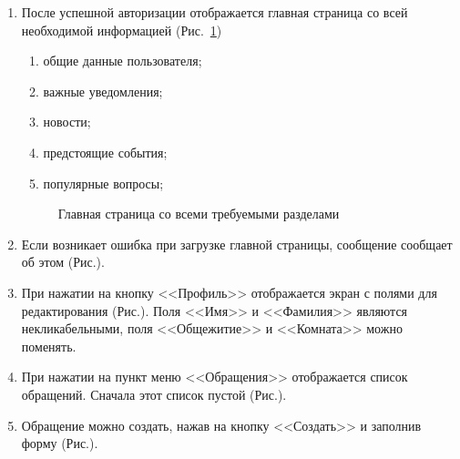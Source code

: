 \documentclass{../includes/TechDoc}
\begin{document}
\begin{enumerate}
        \item После успешной авторизации отображается главная страница со всей необходимой информацией (Рис.~\ref{fig:main_page})
        \begin{enumerate}
            \item общие данные пользователя;
            \item важные уведомления;
            \item новости;
            \item предстоящие события;
            \item популярные вопросы;
        \end{enumerate}
        \begin{figure}[ht]
            \centering
            \caption{Главная страница со всеми требуемыми разделами}
            \label{fig:main_page}
        \end{figure}

        \item Если возникает ошибка при загрузке главной страницы, сообщение сообщает об этом (Рис.).

        \item При нажатии на кнопку <<Профиль>> отображается экран с полями для редактирования (Рис.).
        Поля <<Имя>> и <<Фамилия>> являются некликабельными, поля <<Общежитие>> и <<Комната>> можно поменять.

        \item При нажатии на пункт меню <<Обращения>> отображается список обращений.
        Сначала этот список пустой (Рис.).

        \item Обращение можно создать, нажав на кнопку <<Создать>> и заполнив форму (Рис.).


\end{enumerate}
\end{document}
